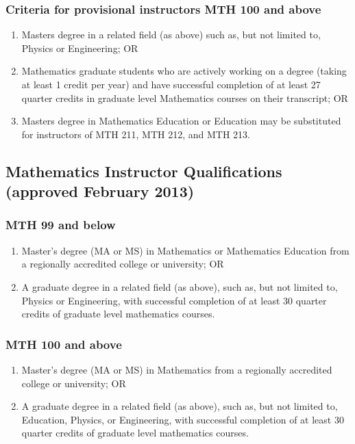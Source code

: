 \subsubsection{Criteria for provisional instructors MTH 100 and above }
\begin{enumerate}
  \item Masters degree in a related field (as above) such as, but not limited to, Physics or Engineering; OR
  \item Mathematics graduate students who are actively working on a degree (taking at least 1 credit per year) and have successful completion of at least 27 quarter credits in graduate level Mathematics courses on their transcript; OR
  \item Masters degree in Mathematics Education or Education may be substituted for instructors of MTH 211, MTH 212, and MTH 213.
\end{enumerate}
\subsection{Mathematics Instructor Qualifications (approved February 2013)}
\subsubsection{MTH 99 and below}
\begin{enumerate}
  \item Master's degree (MA or MS) in Mathematics or Mathematics Education from a regionally accredited college or university; OR
  \item A graduate degree in a related field (as above), such as, but not limited to, Physics or Engineering, with successful completion of at least 30 quarter credits of graduate level mathematics courses.
\end{enumerate}
\subsubsection{MTH 100 and above}
\begin{enumerate}
  \item  Master's degree (MA or MS) in Mathematics from a regionally accredited college or university; OR
  \item A graduate degree in a related field (as above), such as, but not limited to, Education, Physics, or Engineering, with successful completion of at least 30 quarter credits of graduate level mathematics courses.
\end{enumerate}
